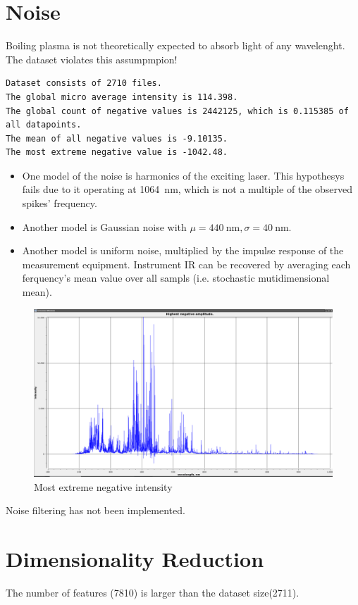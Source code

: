 \documentclass{article}
\begin{document}
\section{Noise}
Boiling plasma is not theoretically expected to absorb light of any wavelenght.
The dataset violates this assumpmpion!
\par
\begin{verbatim}
Dataset consists of 2710 files.
The global micro average intensity is 114.398.
The global count of negative values is 2442125, which is 0.115385 of all datapoints.
The mean of all negative values is -9.10135.
The most extreme negative value is -1042.48.
\end{verbatim}
\begin{itemize}
\item{One model of the noise is harmonics of the exciting laser.
This hypothesys fails due to it operating at \SI{1064}{\nano\metre}, which is not a multiple of the observed spikes' frequency.}
\item{Another model is Gaussian noise with $\mu=\SI{440}{\nano\metre}, \sigma=\SI{40}{\nano\metre}$.}
\item{Another model is uniform noise, multiplied by the impulse response of the measurement equipment.
Instrument IR can be recovered by averaging each ferquency's mean value over all sampls (i.e. stochastic mutidimensional mean).}
\end{itemize}
\begin{figure}
\caption{Most extreme negative intensity}
\centering
\includegraphics[width=1.25\textwidth]{img/negatives}
\end{figure}
Noise filtering has not been implemented.


\section{Dimensionality Reduction}
The number of features (7810) is larger than the dataset size(2711).
\end{document}
